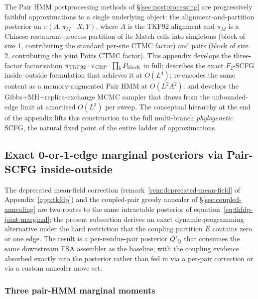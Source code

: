 
The Pair HMM postprocessing methods of \S\ref{sec:postprocessing}
are progressively faithful approximations to a single underlying
object: the alignment-and-partition posterior on
$\pi(A, \pi_{\!M} \mid X, Y)$, where $A$ is the TKF92 alignment and
$\pi_{\!M}$ is a Chinese-restaurant-process partition of its Match
cells into singletons (block of size 1, contributing the standard
per-site CTMC factor) and pairs (block of size 2, contributing the
joint Potts CTMC factor). This appendix develops the three-factor
factorisation $\pi_{\textsc{TKF}92} \cdot \pi_{\mathrm{CRP}} \cdot
\prod_b P_{\mathrm{block}}$ in full; describes the exact $F_2$-SCFG
inside--outside formulation that achieves it at $O(L^4)$;
re-encodes the same content as a memory-augmented Pair HMM at
$O(L^2 A^2)$; and develops the Gibbs+MH+replica-exchange MCMC
sampler that draws from the unbounded-edge limit at amortised
$O(L^3)$ per sweep. The conceptual hierarchy at the end of the
appendix lifts this construction to the full multi-branch
\emph{phylogenetic} SCFG, the natural fixed point of the entire
ladder of approximations.

\subsection{Exact 0-or-1-edge marginal posteriors via Pair-SCFG inside-outside}
\label{sec:f2-scfg}

The deprecated mean-field correction
(remark~\ref{rem:deprecated-mean-field} of
Appendix~\ref{app:tkfdp}) and the coupled-pair greedy annealer of
\S\ref{sec:coupled-annealing} are two routes to the same
intractable posterior of
equation~\ref{eq:tkfdp-joint-marginal}; the present subsection
derives an exact dynamic-programming alternative under the hard
restriction that the coupling partition $E$ contains zero or one
edge. The result is a per-residue-pair posterior $Q'_{ij}$ that
consumes the same downstream FSA assembler as the baseline, with
the coupling evidence absorbed exactly into the posterior rather
than fed in via a per-pair correction or via a custom annealer
move set.

\subsubsection*{Three pair-HMM marginal moments}

